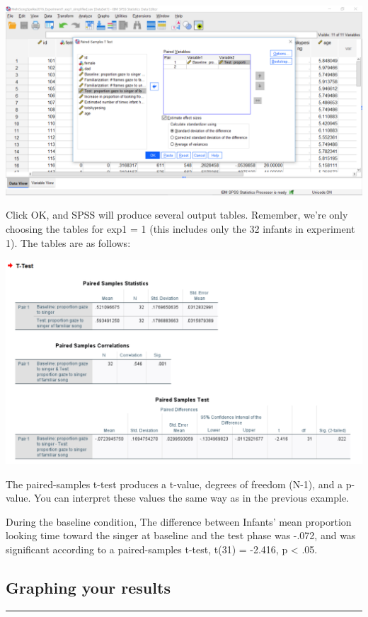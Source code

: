 \documentclass[]{book}
\begin{document}
\includegraphics{img/6.4.18.png}

Click {OK}, and SPSS will produce several output tables. Remember, we're
only choosing the tables for exp1 = 1 (this includes only the 32 infants
in experiment 1). The tables are as follows:

\includegraphics{img/6.4.19.png}

The paired-samples t-test produces a t-value, degrees of freedom (N-1),
and a p-value. You can interpret these values the same way as in the
previous example.

During the baseline condition, The difference between Infants' mean
proportion looking time toward the singer at baseline and the test phase
was -.072, and was significant according to a paired-samples t-test,
t(31) = -2.416, p \textless{} .05.

\subsection{Graphing your results}\label{graphing-your-results}

\begin{center}\rule{0.5\linewidth}{0.5pt}\end{center}
\end{document}
